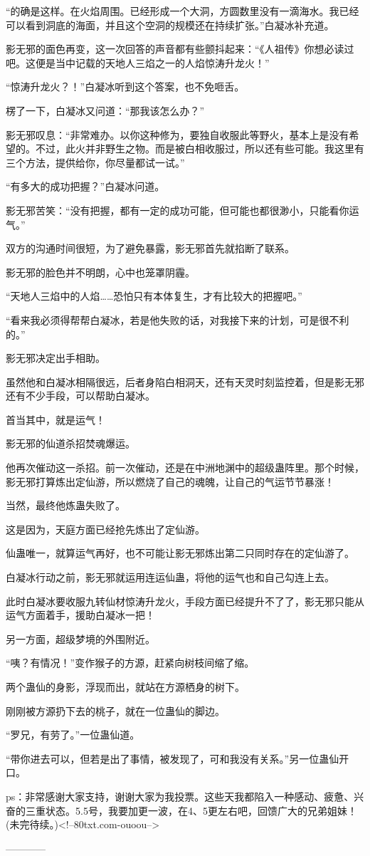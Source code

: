 \begin{this_body}
“的确是这样。在火焰周围。已经形成一个大洞，方圆数里没有一滴海水。我已经可以看到洞底的海面，并且这个空洞的规模还在持续扩张。”白凝冰补充道。

影无邪的面色再变，这一次回答的声音都有些颤抖起来：“《人祖传》你想必读过吧。这便是当中记载的天地人三焰之一的人焰惊涛升龙火！”

“惊涛升龙火？！”白凝冰听到这个答案，也不免咂舌。

楞了一下，白凝冰又问道：“那我该怎么办？”

影无邪叹息：“非常难办。以你这种修为，要独自收服此等野火，基本上是没有希望的。不过，此火并非野生之物。而是被白相收服过，所以还有些可能。我这里有三个方法，提供给你，你尽量都试一试。”

“有多大的成功把握？”白凝冰问道。

影无邪苦笑：“没有把握，都有一定的成功可能，但可能也都很渺小，只能看你运气。”

双方的沟通时间很短，为了避免暴露，影无邪首先就掐断了联系。

影无邪的脸色并不明朗，心中也笼罩阴霾。

“天地人三焰中的人焰……恐怕只有本体复生，才有比较大的把握吧。”

“看来我必须得帮帮白凝冰，若是他失败的话，对我接下来的计划，可是很不利的。”

影无邪决定出手相助。

虽然他和白凝冰相隔很远，后者身陷白相洞天，还有天灵时刻监控着，但是影无邪还有不少手段，可以帮助白凝冰。

首当其中，就是运气！

影无邪的仙道杀招焚魂爆运。

他再次催动这一杀招。前一次催动，还是在中洲地渊中的超级蛊阵里。那个时候，影无邪打算炼出定仙游，所以燃烧了自己的魂魄，让自己的气运节节暴涨！

当然，最终他炼蛊失败了。

这是因为，天庭方面已经抢先炼出了定仙游。

仙蛊唯一，就算运气再好，也不可能让影无邪炼出第二只同时存在的定仙游了。

白凝冰行动之前，影无邪就运用连运仙蛊，将他的运气也和自己勾连上去。

此时白凝冰要收服九转仙材惊涛升龙火，手段方面已经提升不了了，影无邪只能从运气方面着手，援助白凝冰一把！

另一方面，超级梦境的外围附近。

“咦？有情况！”变作猴子的方源，赶紧向树枝间缩了缩。

两个蛊仙的身影，浮现而出，就站在方源栖身的树下。

刚刚被方源扔下去的桃子，就在一位蛊仙的脚边。

“罗兄，有劳了。”一位蛊仙道。

“带你进去可以，但若是出了事情，被发现了，可和我没有关系。”另一位蛊仙开口。

ps：非常感谢大家支持，谢谢大家为我投票。这些天我都陷入一种感动、疲惫、兴奋的三重状态。5.5号，我要加更一波，在4、5更左右吧，回馈广大的兄弟姐妹！(未完待续。)<!--80txt.com-ouoou-->

------------

\end{this_body}

